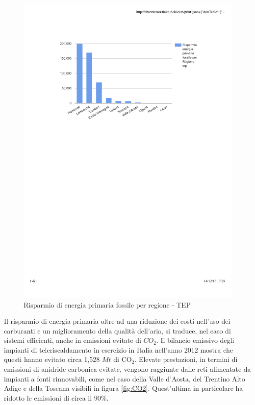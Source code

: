 \documentclass[laurea,oneside,11pt]{USiena_tesiLM}
\begin{document}
\begin{figure}[!ht]
\centering
\includegraphics[width=\textwidth]{figure/tep} 
\caption{Risparmio di energia primaria fossile per regione - TEP}
\label{fig:tep}
\end{figure}

Il risparmio di energia primaria oltre ad una riduzione dei costi nell'uso dei carburanti e un miglioramento della qualità dell'aria, si traduce, nel caso di sistemi efficienti, anche in emissioni evitate di $CO_2$.
Il bilancio emissivo degli impianti di teleriscaldamento in esercizio in Italia nell'anno 2012 mostra che questi hanno evitato circa 1,528 $Mt$ di CO$_2$.
Elevate prestazioni, in termini di emissioni di anidride carbonica evitate, vengono raggiunte dalle reti alimentate da impianti a fonti rinnovabili, come nel caso della Valle d'Aosta, del Trentino Alto Adige e della Toscana visibili in figura \ref{fig:CO2}. Quest'ultima in particolare ha ridotto le emissioni di circa il 90\%.
\end{document}
